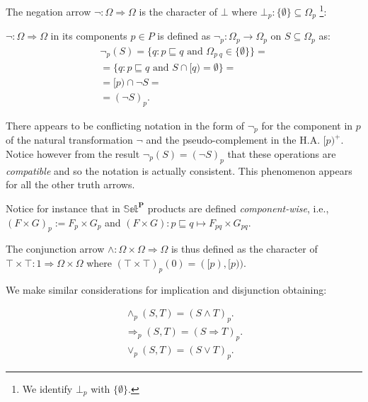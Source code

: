The negation arrow $\neg: \Omega \Rightarrow \Omega$ is the character of $\bot$ where $\bot_p: \{\emptyset\} \subseteq \Omega_p$ \footnote{We identify $\bot_p$ with $\{\emptyset\}$.}:

\begin{definition}
	$\neg: \Omega \Rightarrow \Omega$ in its components $p\in P$ is defined as $\neg_p : \Omega_p \rightarrow \Omega_p$ on $S \subseteq \Omega_p$ as:
	\begin{gather*}
		\neg_p (S) = \{ q : p \sqsubseteq q \text{ and } \Omega_{p \; q} \in \{\emptyset\}\} = \\
		= \{ q : p \sqsubseteq q \text{ and } S \cap [q) = \emptyset\}= \\
		= [p) \cap \neg S = \\
		= (\neg S)_p.
	\end{gather*}	
\end{definition}

\begin{remark}
	There appears to be conflicting notation in the form of $\neg_p$ for the component in $p$ of the natural transformation $\neg$ and the pseudo-complement in the H.A. $[p)^+$. \newline
	Notice however from the result $\neg_p (S) = (\neg S)_p$ that these operations are \emph{compatible} and so the notation is actually consistent.\newline
	This phenomenon appears for all the other truth arrows.
\end{remark}

Notice for instance that in $\mathbb{Set}^\textbf{P}$ products are defined \emph{component-wise}, i.e., $(F \times G)_p := F_p \times G_p$ and $(F \times G) : p \sqsubseteq q \mapsto F_{pq} \times G_{pq}$. \newline 

The conjunction arrow $\land : \Omega \times \Omega \Rightarrow \Omega$ is thus defined as the character of
$\top \times \top : 1 \Rightarrow \Omega \times \Omega$ where $(\top \times \top)_p(0) = ([p),[p))$.
\newline

We make similar considerations for implication and disjunction obtaining:

\begin{gather*}
	\land_p (S,T) = (S \land T)_p. \\
	\Rightarrow_p (S,T) = (S \Rightarrow T)_p.\\
	\lor_p (S,T) = (S \lor T)_p. 
\end{gather*}

